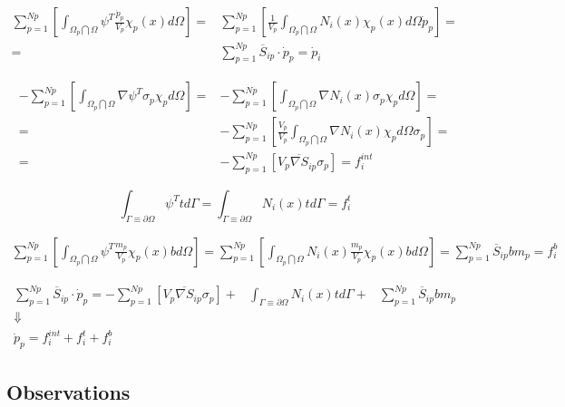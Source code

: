 \message{ !name(../../../mpm.tex)}\documentclass[10pt,a4paper]{article}
\begin{document}
\begin{eqnarray}  
  \sum^{Np}_{p=1} \left[ \int_{\Omega_p \bigcap \Omega}
  \psi^T\frac{\dot{p}_p}{V_p}\chi_p(x) d\Omega \right] =& \sum^{Np}_{p=1}\left[ \frac{1}{V_p}\int_{\Omega_p \bigcap \Omega} N_i(x) \chi_p(x) d\Omega \dot{p}_p  \right] = \nonumber \\
  =& \sum_{p=1}^{Np} \overline{S}_{ip}\cdot \dot{p}_p = \dot{p}_i
\end{eqnarray}

\begin{eqnarray}
  -\sum^{Np}_{p=1}\left[ \int_{\Omega_p \bigcap \Omega}\nabla\psi^T \sigma_p \chi_p  d\Omega \right] =& -\sum^{Np}_{p=1}\left[ \int_{\Omega_p \bigcap \Omega}\nabla N_i(x) \sigma_p \chi_p  d\Omega \right] = \nonumber \\
  =& - \sum^{Np}_{p=1}\left[ \frac{V_p}{V_p} \int_{\Omega_p \bigcap \Omega}\nabla N_i(x) \chi_p  d\Omega \sigma_p \right] = \nonumber \\
  =& - \sum^{Np}_{p=1}\left[V_p\overline{\nabla S}_{ip} \sigma_p \right] = f_i^{int}
\end{eqnarray}

\begin{equation}
  \int_{\Gamma \equiv \partial \Omega} \psi^T t d\Gamma = \int_{\Gamma \equiv \partial \Omega} N_i(x) t d\Gamma = f_i^t
\end{equation}

\begin{eqnarray}
  \sum_{p=1}^{Np} \left[ \int_{\Omega_p \bigcap \Omega} \psi^T \frac{m_p}{V_p} \chi_p(x) b d\Omega \right] = \sum_{p=1}^{Np} \left[ \int_{\Omega_p \bigcap \Omega} N_i(x)  \frac{m_p}{V_p} \chi_p(x) b d\Omega  \right] =  \sum_{p=1}^{Np} \overline{S}_{ip}b m_p = f_i^b  
\end{eqnarray}


\begin{eqnarray}
  \sum_{p=1}^{Np} \overline{S}_{ip}\cdot \dot{p}_p  =
  -\sum^{Np}_{p=1}\left[V_p\overline{\nabla S}_{ip} \sigma_p \right]
  +&  \int_{\Gamma \equiv \partial \Omega} N_i(x) t d\Gamma \nonumber
     +& \sum_{p=1}^{Np} \overline{S}_{ip}b m_p \nonumber\\
  \Downarrow&  \\
  \dot{p}_p = f_i^{int} + f_i^t + f_i^b \nonumber
\end{eqnarray}





\subsection{Observations}
\label{sec:observations}





\end{document}
